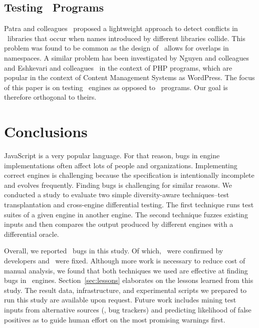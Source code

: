 \documentclass[10pt,conference,anonymous]{IEEEtran}
\begin{document}
\subsection{Testing \js\ Programs}
Patra and colleagues~\cite{Patra:2018:CFU:3180155.3180184} proposed a
lightweight approach to detect conflicts in \js\ libraries that occur
when names introduced by different libraries collide. This problem was
found to be common as the design of \js\ allows for overlaps in
namespaces. A similar problem has been investigated by Nguyen and
colleagues~\cite{nguyen-etal-icse2014} and Eshkevari and
colleagues~\cite{eshkevari-etal-icpc2014} in the context of PHP
programs, which are popular in the context of Content Management
Systems as WordPress. The focus of this paper is on testing
\js\ engines as opposed to \js\ programs. Our goal is therefore
orthogonal to theirs.

\section{Conclusions}

JavaScript is a very popular language. For that reason, bugs in engine
implementations often affect lots of people and organizations.
Implementing correct engines is challenging because the specification
is intentionally incomplete and evolves frequently. Finding bugs is
challenging for similar reasons. We conducted a study to evaluate two
simple diversity-aware techniques--test transplantation and
cross-engine differential testing. The first technique runs test
suites of a given engine in another engine. The second technique
fuzzes existing inputs and then compares the output produced by
different engines with a differential oracle.

Overall, we reported \totalBugsReported\ bugs in this study. Of which,
\totalBugsConfirmed\ were confirmed by developers and
\totalBugsFixed\ were fixed. Although more work is necessary to
reduce cost of manual analysis, we found that both techniques we used
are effective at finding bugs in
\js\ engines. Section~\ref{sec:lessons} elaborates on the lessons
learned from this study. The result data, infrastructure, and
experimental scripts we prepared to run this study are available upon
request. Future work includes mining test inputs from alternative
sources (\eg{}, bug trackers) and predicting likelihood of false
positives as to guide human effort on the most promising warnings
first.

\balance


\end{document}
